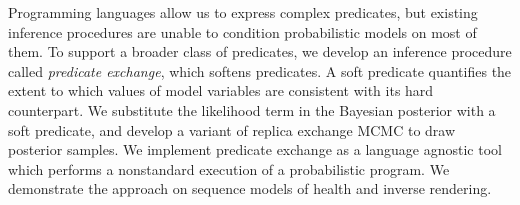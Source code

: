 Programming languages allow us to express complex predicates, but existing inference procedures are unable to condition probabilistic models on most of them.
To support a broader class of predicates, we develop an inference procedure called \emph{predicate exchange}, which softens predicates.
A soft predicate quantifies the extent to which values of model variables
are consistent with its hard counterpart.
We substitute the likelihood term in the Bayesian posterior with a soft predicate, and develop a variant of replica exchange MCMC  to draw posterior samples.
We implement predicate exchange as a language agnostic tool which performs a nonstandard execution of a probabilistic program. 
We demonstrate the approach on sequence models of health and inverse rendering. 



%       